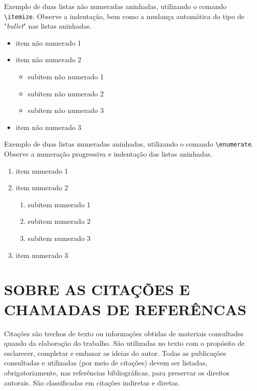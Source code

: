 Exemplo de duas listas não numeradas aninhadas, utilizando o comando \verb|\itemize|. Observe a indentação, bem como a mudança automática do tipo de "\textit{bullet}"{} nas listas aninhadas.

\begin{itemize}
    \item item não numerado 1
    \item item não numerado 2
    \begin{itemize}
        \item subitem não numerado 1
        \item subitem não numerado 2
        \item subitem não numerado 3
    \end{itemize}
    \item item não numerado 3
\end{itemize}

Exemplo de duas listas numeradas aninhadas, utilizando o comando \verb|\enumerate|. Observe a numeração progressiva e indentação das listas aninhadas.

\begin{enumerate}
    \item item numerado 1
    \item item numerado 2
    \begin{enumerate}
        \item subitem numerado 1
        \item subitem numerado 2
        \item subitem numerado 3
    \end{enumerate}
    \item item numerado 3
\end{enumerate}

\chapter{SOBRE AS CITAÇÕES E CHAMADAS DE REFERÊNCAS}
\label{chap:apSobreCita}

Citações são trechos de texto ou informações obtidas de materiais consultadss quando da elaboração do trabalho. São utilizadas no texto com o propósito de esclarecer, completar e embasar as ideias do autor. Todas as publicações consultadas e utilizadas (por meio de citações) devem ser listadas, obrigatoriamente, nas referências bibliográficas, para preservar os direitos autorais. São classificadas em citações indiretas e diretas.

